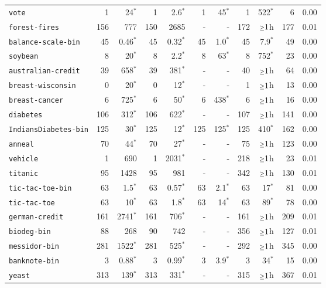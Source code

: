 \begin{tabular}{lrrrrrrrrrr}
\texttt{vote} & 1 & 24$^*$ & 1 & 2.6$^*$ & 1 & 45$^*$ & 1 & 522$^*$ & 6 & 0.00\\
\texttt{forest-fires} & 156 & 777 & 150 & 2685 & - & - & 172 & $\mathsmaller{\geq}1$h & 177 & 0.01\\
\texttt{balance-scale-bin} & 45 & 0.46$^*$ & 45 & 0.32$^*$ & 45 & 1.0$^*$ & 45 & 7.9$^*$ & 49 & 0.00\\
\texttt{soybean} & 8 & 20$^*$ & 8 & 2.2$^*$ & 8 & 63$^*$ & 8 & 752$^*$ & 23 & 0.00\\
\texttt{australian-credit} & 39 & 658$^*$ & 39 & 381$^*$ & - & - & 40 & $\mathsmaller{\geq}1$h & 64 & 0.00\\
\texttt{breast-wisconsin} & 0 & 20$^*$ & 0 & 12$^*$ & - & - & 1 & $\mathsmaller{\geq}1$h & 13 & 0.00\\
\texttt{breast-cancer} & 6 & 725$^*$ & 6 & 50$^*$ & 6 & 438$^*$ & 6 & $\mathsmaller{\geq}1$h & 16 & 0.00\\
\texttt{diabetes} & 106 & 312$^*$ & 106 & 622$^*$ & - & - & 107 & $\mathsmaller{\geq}1$h & 141 & 0.00\\
\texttt{IndiansDiabetes-bin} & 125 & 30$^*$ & 125 & 12$^*$ & 125 & 125$^*$ & 125 & 410$^*$ & 162 & 0.00\\
\texttt{anneal} & 70 & 44$^*$ & 70 & 27$^*$ & - & - & 75 & $\mathsmaller{\geq}1$h & 123 & 0.00\\
\texttt{vehicle} & 1 & 690 & 1 & 2031$^*$ & - & - & 218 & $\mathsmaller{\geq}1$h & 23 & 0.01\\
\texttt{titanic} & 95 & 1428 & 95 & 981 & - & - & 342 & $\mathsmaller{\geq}1$h & 130 & 0.01\\
\texttt{tic-tac-toe-bin} & 63 & 1.5$^*$ & 63 & 0.57$^*$ & 63 & 2.1$^*$ & 63 & 17$^*$ & 81 & 0.00\\
\texttt{tic-tac-toe} & 63 & 10$^*$ & 63 & 1.8$^*$ & 63 & 14$^*$ & 63 & 89$^*$ & 78 & 0.00\\
\texttt{german-credit} & 161 & 2741$^*$ & 161 & 706$^*$ & - & - & 161 & $\mathsmaller{\geq}1$h & 209 & 0.01\\
\texttt{biodeg-bin} & 88 & 268 & 90 & 742 & - & - & 356 & $\mathsmaller{\geq}1$h & 127 & 0.01\\
\texttt{messidor-bin} & 281 & 1522$^*$ & 281 & 525$^*$ & - & - & 292 & $\mathsmaller{\geq}1$h & 345 & 0.00\\
\texttt{banknote-bin} & 3 & 0.88$^*$ & 3 & 0.99$^*$ & 3 & 3.9$^*$ & 3 & 34$^*$ & 15 & 0.00\\
\texttt{yeast} & 313 & 139$^*$ & 313 & 331$^*$ & - & - & 315 & $\mathsmaller{\geq}1$h & 367 & 0.01\\

\end{tabular}
